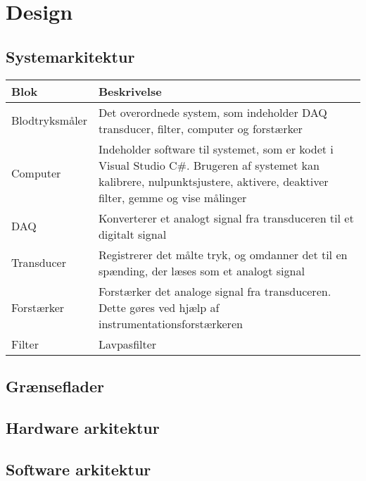 \chapter{Design}

\section{Systemarkitektur} 

\begin{longtabu} to 
	Blok &	Beskrivelse \\[-1ex]
	\midrule
	Blodtryksmåler & Det overordnede system, som indeholder DAQ transducer, filter, computer og forstærker\\[-1ex]
	Computer & Indeholder software til systemet, som er kodet i Visual Studio C\#. Brugeren af systemet kan kalibrere, nulpunktsjustere, aktivere, deaktiver filter, gemme og vise målinger\\[-1ex]
	DAQ & Konverterer et analogt signal fra transduceren til et digitalt signal\\[-1ex]
	Transducer & Registrerer det målte tryk, og omdanner det til en spænding, der læses som et analogt signal\\[-1ex]
	Forstærker & Forstærker det analoge signal fra transduceren. Dette gøres ved hjælp af instrumentationsforstærkeren\\[-1ex]
	Filter & Lavpasfilter\\[-1ex]
\end{longtabu}



\section{Grænseflader}


\section{Hardware arkitektur}


\section{Software arkitektur}

